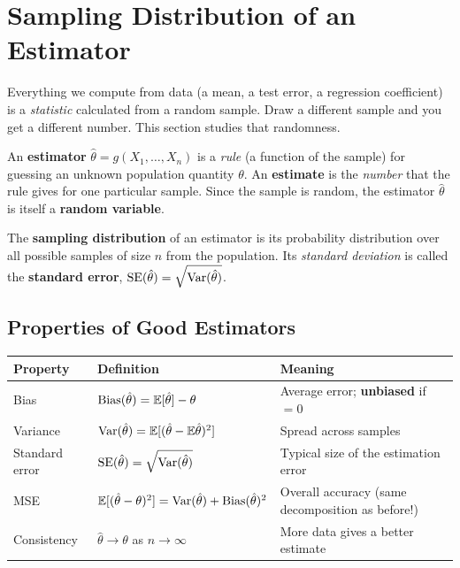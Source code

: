 \section{Sampling Distribution of an Estimator}

Everything we compute from data (a mean, a test error, a regression coefficient) is a \emph{statistic} calculated from a random sample. Draw a different sample and you get a different number. This section studies that randomness.

\begin{definition}
An \textbf{estimator} $\hat\theta=g(X_1,\dots,X_n)$ is a \emph{rule} (a function of the sample) for guessing an unknown population quantity $\theta$. An \textbf{estimate} is the \emph{number} that the rule gives for one particular sample. Since the sample is random, the estimator $\hat\theta$ is itself a \textbf{random variable}.
\end{definition}

\begin{definition}
The \textbf{sampling distribution} of an estimator is its probability distribution over all possible samples of size $n$ from the population. Its \emph{standard deviation} is called the \textbf{standard error}, $\operatorname{SE}(\hat\theta)=\sqrt{\operatorname{Var}(\hat\theta)}$.
\end{definition}


\subsection{Properties of Good Estimators}

\begin{center}
\begin{tabular}{@{}p{3.3cm}p{5.2cm}p{5cm}@{}}
\toprule
\textbf{Property} & \textbf{Definition} & \textbf{Meaning}\\
\midrule
Bias & $\operatorname{Bias}(\hat\theta)=\mathbb{E}[\hat\theta]-\theta$ & Average error; \textbf{unbiased} if $=0$\\
Variance & $\operatorname{Var}(\hat\theta)=\mathbb{E}[(\hat\theta-\mathbb{E}\hat\theta)^2]$ & Spread across samples\\
Standard error & $\operatorname{SE}(\hat\theta)=\sqrt{\operatorname{Var}(\hat\theta)}$ & Typical size of the estimation error\\
MSE & $\mathbb{E}[(\hat\theta-\theta)^2]=\operatorname{Var}(\hat\theta)+\operatorname{Bias}(\hat\theta)^2$ & Overall accuracy (same decomposition as before!)\\
Consistency & $\hat\theta\to\theta$ as $n\to\infty$ & More data gives a better estimate\\
\bottomrule
\end{tabular}
\end{center}

